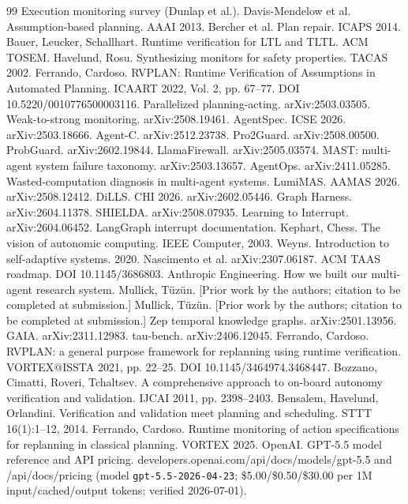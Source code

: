 \documentclass[acmsmall,screen]{acmart}
\begin{document}
\begin{thebibliography}{99}
 Execution monitoring survey (Dunlap et al.).
 Davis-Mendelow et al. Assumption-based planning. AAAI 2013.
 Bercher et al. Plan repair. ICAPS 2014.
 Bauer, Leucker, Schallhart. Runtime verification for LTL and TLTL. ACM TOSEM.
 Havelund, Rosu. Synthesizing monitors for safety properties. TACAS 2002.
 Ferrando, Cardoso. RVPLAN: Runtime Verification of Assumptions in Automated Planning. ICAART 2022, Vol. 2, pp. 67--77. DOI 10.5220/0010776500003116.
 Parallelized planning-acting. arXiv:2503.03505.
 Weak-to-strong monitoring. arXiv:2508.19461.
 AgentSpec. ICSE 2026. arXiv:2503.18666.
 Agent-C. arXiv:2512.23738.
 Pro2Guard. arXiv:2508.00500.
 ProbGuard. arXiv:2602.19844.
 LlamaFirewall. arXiv:2505.03574.
 MAST: multi-agent system failure taxonomy. arXiv:2503.13657.
 AgentOps. arXiv:2411.05285.
 Wasted-computation diagnosis in multi-agent systems.
 LumiMAS. AAMAS 2026. arXiv:2508.12412.
 DiLLS. CHI 2026. arXiv:2602.05446.
 Graph Harness. arXiv:2604.11378.
 SHIELDA. arXiv:2508.07935.
 Learning to Interrupt. arXiv:2604.06452.
 LangGraph interrupt documentation.
 Kephart, Chess. The vision of autonomic computing. IEEE Computer, 2003.
 Weyns. Introduction to self-adaptive systems. 2020.
 Nascimento et al. arXiv:2307.06187.
 ACM TAAS roadmap. DOI 10.1145/3686803.
 Anthropic Engineering. How we built our multi-agent research system.
 Mullick, T\"uz\"un. [Prior work by the authors; citation to be completed at submission.]
 Mullick, T\"uz\"un. [Prior work by the authors; citation to be completed at submission.]
 Zep temporal knowledge graphs. arXiv:2501.13956.
 GAIA. arXiv:2311.12983.
 tau-bench. arXiv:2406.12045.
 Ferrando, Cardoso. RVPLAN: a general purpose framework for replanning using runtime verification. VORTEX@ISSTA 2021, pp. 22--25. DOI 10.1145/3464974.3468447.
 Bozzano, Cimatti, Roveri, Tchaltsev. A comprehensive approach to on-board autonomy verification and validation. IJCAI 2011, pp. 2398--2403.
 Bensalem, Havelund, Orlandini. Verification and validation meet planning and scheduling. STTT 16(1):1--12, 2014.
 Ferrando, Cardoso. Runtime monitoring of action specifications for replanning in classical planning. VORTEX 2025.
 OpenAI. GPT-5.5 model reference and API pricing. developers.openai.com/api/docs/models/gpt-5.5 and /api/docs/pricing (model \texttt{gpt-5.5-2026-04-23}; \$5.00/\$0.50/\$30.00 per 1M input/cached/output tokens; verified 2026-07-01).
\end{thebibliography}
\end{document}
